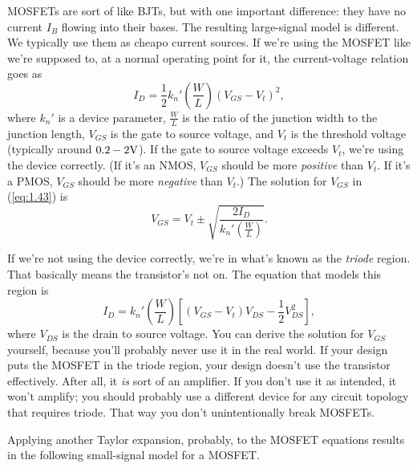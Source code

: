 MOSFETs are sort of like BJTs, but with one important difference: they have no current $I_{B}$ flowing into their bases. The resulting large-signal model is different. We typically use them as cheapo current sources. If we're using the MOSFET like we're supposed to, at a normal operating point for it, the current-voltage relation goes as
\begin{equation}
\label{eq:1.43}
I_{D} = \frac{1}{2} k_{n}' \left( \frac{W}{L} \right) \left( V_{GS} - V_{t} \right)^{2},
\end{equation}
where $k_{n}'$ is a device parameter, $\frac{W}{L}$ is the ratio of the junction width to the junction length, $V_{GS}$ is the gate to source voltage, and $V_{t}$ is the threshold voltage (typically around $0.2 \-- 2 \si{\V}$). If the gate to source voltage exceeds $V_{t}$, we're using the device correctly. (If it's an NMOS, $V_{GS}$ should be more \textit{positive} than $V_{t}$. If it's a PMOS, $V_{GS}$ should be more \textit{negative} than $V_{t}$.) The solution for $V_{GS}$ in (\cref{eq:1.43}) is
\begin{equation}
\label{eq:1.44}
V_{GS} = V_{t} \pm \sqrt{ \frac{2 I_{D}}{k_{n}' \left( \frac{W}{L} \right)}}.
\end{equation}

If we're not using the device correctly, we're in what's known as the \textit{triode} region. That basically means the transistor's not on. The equation that models this region is
\begin{equation}
\label{eq:1.45}
I_{D} = k_{n}' \left( \frac{W}{L} \right) \left[ \left( V_{GS} - V_{t} \right) V_{DS} - \frac{1}{2} V_{DS}^{2} \right],
\end{equation}
where $V_{DS}$ is the drain to source voltage. You can derive the solution for $V_{GS}$ yourself, because you'll probably never use it in the real world. If your design puts the MOSFET in the triode region, your design doesn't use the transistor effectively. After all, it \textit{is} sort of an amplifier. If you don't use it as intended, it won't amplify; you should probably use a different device for any circuit topology that requires triode. That way you don't unintentionally break MOSFETs.

Applying another Taylor expansion, probably, to the MOSFET equations results in the following small-signal model for a MOSFET.

